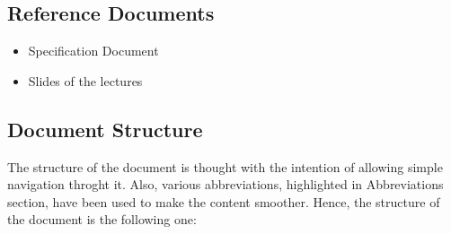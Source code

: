\documentclass{article}
\begin{document}
	\bigskip

	\subsection{Reference Documents}
	
		\smallskip
		
		\begin{itemize}
			
			\item Specification Document
			\item Slides of the lectures
			
		\end{itemize}
	
	\newpage 
	
	\subsection{Document Structure}
	
	The structure of the document is thought with the intention of allowing simple navigation throght it. Also, various abbreviations, highlighted in Abbreviations section, have been used to make the content smoother.
	Hence, the structure of the document is the following one:
	
\end{document}
